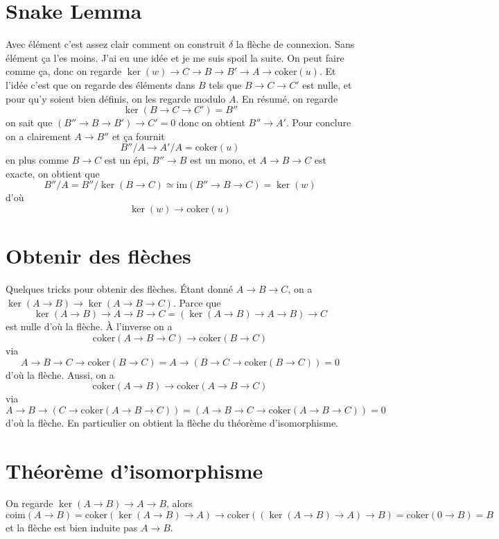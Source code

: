\documentclass[a4paper,12pt]{book}
\newcommand{\im}{\textrm{im}}
\newcommand{\coker}{\textrm{coker}}
\newcommand{\coim}{\textrm{coim}}
\theoremstyle{plain}
\theoremstyle{definition}
\theoremstyle{remark}
\begin{document}
\section{Snake Lemma}
Avec élément c'est assez clair comment on construit $\delta$ la
flèche de connexion. Sans élément ça l'es moins. J'ai eu une
idée et je me suis spoil la suite. On peut faire comme ça, donc
on regarde $\ker(w)\to C\to B\to B'\to A\to \coker(u)$. Et l'idée
c'est que on regarde des éléments dans $B$ tels que $B\to C\to C'$
est nulle, et pour qu'y soient bien définis, on les regarde modulo
$A$. En résumé, on regarde \[\ker(B\to C\to C')=B''\] on sait que
$(B''\to B\to B')\to C'=0$ donc on obtient $B''\to A'$. Pour 
conclure on a clairement $A\to B''$ et ça fournit
\[B''/A\to A'/A=\coker(u)\] en plus comme
$B\to C$ est un épi, $B''\to B$ est un mono, et $A\to B\to C$ est
exacte, on obtient que 
\[B''/A=B''/\ker(B\to C)\simeq\im( B''\to B\to C)=\ker(w)\] d'où
\[\ker(w)\to \coker(u)\]

\section{Obtenir des flèches}
Quelques tricks pour obtenir des flèches. Étant donné
$A\to B\to C$, on a $\ker(A\to B)\to \ker(A\to B\to C)$.
Parce que \[\ker( A\to B)\to A\to B\to C=(\ker(A\to B)\to A\to B)\to C\]
est nulle d'où la flèche. À l'inverse on a 
\[\coker(A\to B\to C)\to \coker(B\to C)\]
via 
\[A\to B\to C\to \coker(B\to C)=A\to (B\to C\to \coker(B\to C))=0\]
d'où la flèche. Aussi, on a 
\[\coker(A\to B)\to \coker(A\to B\to C)\]
via \[A\to B\to (C\to \coker(A\to B\to C))=(A\to B \to C\to \coker(A\to B\to C))=0\]
d'où la flèche. En particulier on obtient la flèche du théorème
d'isomorphisme.

\section{Théorème d'isomorphisme}
On regarde $\ker(A\to B)\to A\to B$, alors
\[\coim(A\to B)=\coker(\ker(A\to B)\to A)\to \coker((\ker(A\to B)\to A)\to B)=\coker(0\to B)=B\]
et la flèche est bien induite pas $A\to B$.



\end{document}
